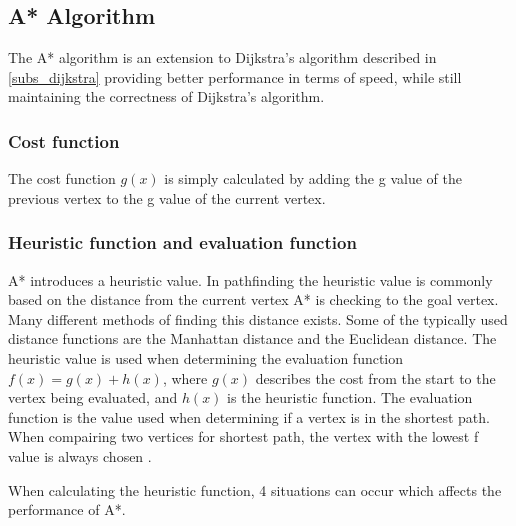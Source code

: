 

  \subsection{A* Algorithm}\label{subs_astar}


  The A* algorithm is an extension to Dijkstra's algorithm described in \cref{subs_dijkstra} providing better performance in terms of speed, while still maintaining the correctness of Dijkstra's algorithm.

  \subsubsection{Cost function}
  The cost function $g(x)$ is simply calculated by adding the g value of the previous vertex to the g value of the current vertex.

  \subsubsection{Heuristic function and evaluation function}
  A* introduces a heuristic value. In pathfinding the heuristic value is commonly based on the distance from the current vertex A* is checking to the goal vertex. Many different methods of finding this distance exists. Some of the typically used distance functions are the Manhattan distance and the Euclidean distance. The heuristic value is used when determining the evaluation function $f(x) = g(x) + h(x)$, where $g(x)$ describes the cost from the start to the vertex being evaluated, and $h(x)$ is the heuristic function. The evaluation function is the value used when determining if a vertex is in the shortest path. When compairing two vertices for shortest path, the vertex with the lowest f value is always chosen \cite{Patel2013}.

  When calculating the heuristic function, 4 situations can occur which affects the performance of A*.

